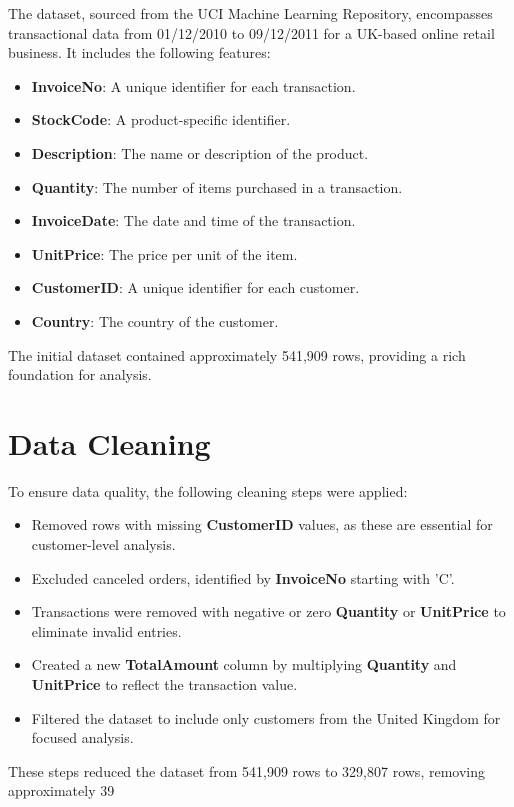 \documentclass[a4paper,12pt]{article}
\begin{document}
The dataset, sourced from the UCI Machine Learning Repository, encompasses transactional data from 01/12/2010 to 09/12/2011 for a UK-based online retail business. It includes the following features:
\begin{itemize}
    \item \textbf{InvoiceNo}: A unique identifier for each transaction.
    \item \textbf{StockCode}: A product-specific identifier.
    \item \textbf{Description}: The name or description of the product.
    \item \textbf{Quantity}: The number of items purchased in a transaction.
    \item \textbf{InvoiceDate}: The date and time of the transaction.
    \item \textbf{UnitPrice}: The price per unit of the item.
    \item \textbf{CustomerID}: A unique identifier for each customer.
    \item \textbf{Country}: The country of the customer.
\end{itemize}
The initial dataset contained approximately 541,909 rows, providing a rich foundation for analysis.

\section{Data Cleaning}

To ensure data quality, the following cleaning steps were applied:
\begin{itemize}
    \item Removed rows with missing \textbf{CustomerID} values, as these are essential for customer-level analysis.
    \item Excluded canceled orders, identified by \textbf{ InvoiceNo} starting with 'C'.
    \item Transactions were removed with negative or zero \textbf{Quantity} or \textbf{UnitPrice} to eliminate invalid entries.
    \item Created a new \textbf{TotalAmount} column by multiplying \textbf{Quantity} and \textbf{UnitPrice} to reflect the transaction value.
    \item Filtered the dataset to include only customers from the United Kingdom for focused analysis.
\end{itemize}
These steps reduced the dataset from 541,909 rows to 329,807 rows, removing approximately 39%
\end{document}
